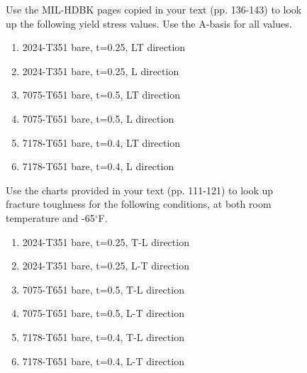 \documentclass[12pt, oneside]{article}
\begin{document}
\begin{enumerate}

\begin{figure}[H]
	\item Use the MIL-HDBK pages copied in your text (pp. 136-143) to look up the following yield stress values. Use the A-basis for all values.
	\begin{enumerate}
		\item 2024-T351 bare, t=0.25, LT direction %
		\item 2024-T351 bare, t=0.25, L direction %
		\item 7075-T651 bare, t=0.5, LT direction %
		\item 7075-T651 bare, t=0.5, L direction %
		\item 7178-T651 bare, t=0.4, LT direction %
		\item 7178-T651 bare, t=0.4, L direction %
	\end{enumerate}
\end{figure}

\begin{figure}[H]
	\item Use the charts provided in your text (pp. 111-121) to look up fracture toughness for the following conditions, at both room temperature and -65$^\circ$F.
	\begin{enumerate}
		\item 2024-T351 bare, t=0.25, T-L direction %
		\item 2024-T351 bare, t=0.25, L-T direction %
		\item 7075-T651 bare, t=0.5, T-L direction %
		\item 7075-T651 bare, t=0.5, L-T direction %
		\item 7178-T651 bare, t=0.4, T-L direction %
		\item 7178-T651 bare, t=0.4, L-T direction %
	\end{enumerate}
\end{figure}


\end{enumerate}
\end{document}

